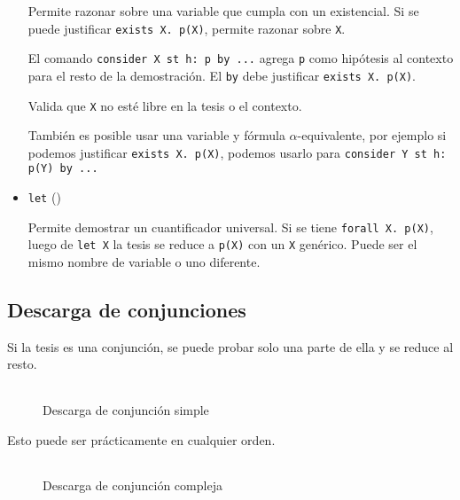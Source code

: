 \begin{itemize}
    Permite razonar sobre una variable que cumpla con un existencial. Si se
    puede justificar \lstinline{exists X. p(X)}, permite razonar sobre
    \lstinline{X}.

    El comando \lstinline{consider X st h: p by ...} agrega \lstinline{p} como
    hipótesis al contexto para el resto de la demostración. El \lstinline{by}
    debe justificar \lstinline{exists X. p(X)}.

    Valida que \lstinline{X} no esté libre en la tesis o el contexto.

    También es posible usar una variable y fórmula $\alpha$-equivalente, por
    ejemplo si podemos justificar \lstinline{exists X. p(X)}, podemos usarlo
    para \lstinline{consider Y st h: p(Y) by ...}

    \item \lstinline{let} ()
    
    Permite demostrar un cuantificador universal. Si se tiene
    \lstinline{forall X. p(X)}, luego de \lstinline{let X} la tesis se reduce a
    \lstinline{p(X)} con un \lstinline{X} genérico. Puede ser el mismo nombre de
    variable o uno diferente.

\end{itemize}

\subsection{Descarga de conjunciones}\label{ppa:sec:and-intro}

Si la tesis es una conjunción, se puede probar solo una parte de ella y se
reduce al resto.

\begin{figure}[H]
    \centering
    \caption{Descarga de conjunción simple}
    \begin{tabular}{c}
        
    \end{tabular}
\end{figure}

Esto puede ser prácticamente en cualquier orden.

\begin{figure}[H]
    \centering
    \caption{Descarga de conjunción compleja}
    \begin{tabular}{c}
    
    \end{tabular}
\end{figure}


